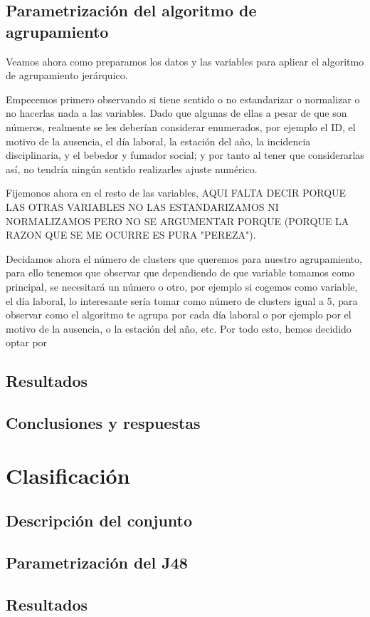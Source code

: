 \documentclass[a4paper, 11pt, twoside, openany, onecolumn, final]{memoir}
\begin{document}
	\section{Parametrización del algoritmo de agrupamiento}
	Veamos ahora como preparamos los datos y las variables para aplicar el algoritmo de agrupamiento jerárquico.
	
	Empecemos primero observando si tiene sentido o no estandarizar o normalizar o no hacerlas nada a las variables. Dado que algunas de ellas a pesar de que son números, realmente se les deberían considerar enumerados, por ejemplo el ID, el motivo de la ausencia, el día laboral, la estación del año, la incidencia disciplinaria, y el bebedor y fumador social; y por tanto al tener que considerarlas así, no tendría ningún sentido realizarles ajuste numérico.
	
	Fijemonos ahora en el resto de las variables,   AQUI FALTA DECIR PORQUE LAS OTRAS VARIABLES NO LAS ESTANDARIZAMOS NI NORMALIZAMOS PERO NO SE ARGUMENTAR PORQUE (PORQUE LA RAZON QUE SE ME OCURRE ES PURA "PEREZA").
	
	Decidamos ahora el número de clusters que queremos para nuestro agrupamiento, para ello tenemos que observar que dependiendo de que variable tomamos como principal, se necesitará un número o otro, por ejemplo si cogemos como variable, el día laboral, lo interesante sería tomar como número de clusters igual a 5, para observar como el algoritmo te agrupa por cada día laboral o por ejemplo por el motivo de la ausencia, o la estación del año, etc.
	Por todo esto, hemos decidido optar por 
	\section{Resultados}
	\section{Conclusiones y respuestas}
	\chapter{Clasificación}
		\section{Descripción del conjunto}
	\section{Parametrización del J48}
	\section{Resultados}
\end{document}
